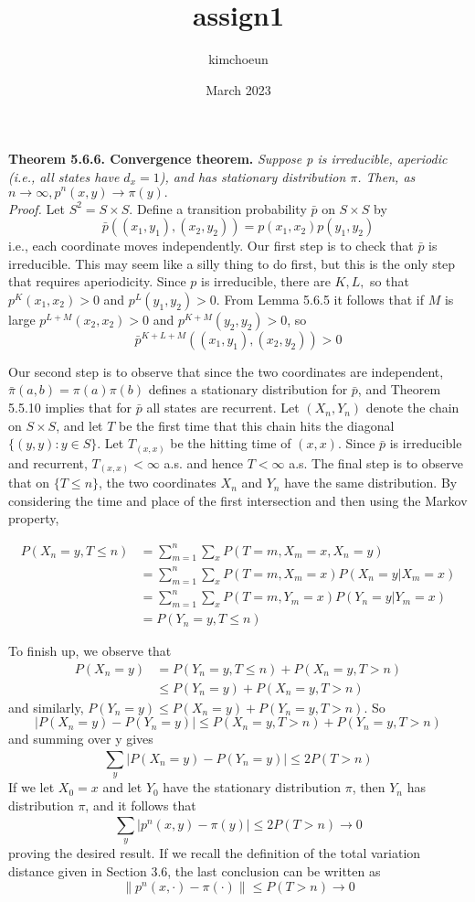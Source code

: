 \documentclass[10pt]{article}
\title{assign1}
\author{kimchoeun}
\date{March 2023}
\begin{document}
\noindent\textbf{Theorem 5.6.6. Convergence theorem.} \textit{Suppose p is irreducible, aperiodic (i.e., all states have $d_{x} = 1$), and has stationary distribution $\pi$. Then, as $n \rightarrow \infty, p^{n}(x,y) \rightarrow \pi(y).$}\\

\noindent\textit{Proof.} Let $S^{2} = S \times S.$ Define a transition probability $\bar{p}$ on $S \times S$ by $$\bar{p}((x_{1}, y_{1}), (x_{2}, y_{2})) = p(x_{1}, x_{2})p(y_{1}, y_{2})$$i.e., each coordinate moves independently. Our first step is to check that $\bar{p}$ is irreducible. This may seem like a silly thing to do first, but this is the only step that requires aperiodicity. Since $p$ is irreducible, there are $K, L,$ so that $p^{K}(x_{1}, x_{2}) > 0$ and $p^{L}(y_{1}, y_{2}) > 0.$ From Lemma 5.6.5 it follows that if $M$ is large $p^{L+M}(x_{2}, x_{2}) > 0$ and $p^{K+M}(y_{2}, y_{2}) > 0$, so $$\bar{p}^{K+L+M}((x_{1}, y_{1}), (x_{2}, y_{2})) > 0$$

Our second step is to observe that since the two coordinates are independent, $\bar{\pi}(a, b) = \pi(a)\pi(b)$ defines a stationary distribution for $\bar{p}$, and Theorem 5.5.10 implies that for $\bar{p}$ all states are recurrent. Let $(X_{n}, Y_{n})$ denote the chain on $S \times S$, and let $T$ be the first time that this chain hits the diagonal $\{(y, y) : y \in S\}$. Let $T_{(x, x)}$ be the hitting time of $(x, x).$ Since $\bar{p}$ is irreducible and recurrent, $T_{(x, x)} < \infty$ a.s. and hence $T < \infty$ a.s. The final step is to observe that on $\{T \le n\}$, the two coordinates $X_{n}$ and $Y_{n}$ have the same distribution. By considering the time and place of the first intersection and then using the Markov property, 

\begin{align}
P(X_{n} = y, T \le n) & = \sum_{m=1}^{n}\sum_{x}^{}P(T = m, X_{m} = x, X_{n} = y)\nonumber\\ 
& = \sum_{m=1}^{n}\sum_{x}^{}P(T = m, X_{m} = x)P(X_{n} = y|X_{m} = x)\nonumber\\
& = \sum_{m=1}^{n}\sum_{x}^{}P(T = m, Y_{m} = x)P(Y_{n} = y|Y_{m} = x)\nonumber\\
& = P(Y_{n} = y, T \le n)\nonumber
\end{align}

\noindent To finish up, we observe that
\begin{align}
P(X_{n} = y) & = P(Y_{n} = y, T \le n) + P(X_{n} = y, T > n)\nonumber\\
& \le P(Y_{n} = y) + P(X_{n} = y, T > n)\nonumber
\end{align}
and similarly, $P(Y_{n} = y) \le P(X_{n} = y) + P(Y_{n} = y, T > n).$ So $$|P(X_{n} = y) - P(Y_{n} = y)| \le P(X_{n} = y, T > n) + P(Y_{n} = y, T > n)$$ and summing over y gives $$\sum_{y}^{}|P(X_{n} = y) - P(Y_{n} = y) | \le 2P(T > n)$$
If we let $X_{0} = x$ and let $Y_{0}$ have the stationary distribution $\pi$, then $Y_{n}$ has distribution $\pi$, and it follows that $$\sum_{y}^{}|p^{n}(x, y) - \pi(y)| \le 2P(T > n) \to 0$$ proving the desired result. If we recall the definition of the total variation distance given in Section 3.6, the last conclusion can be written as $$\|p^{n}(x, \cdot) - \pi(\cdot)\| \le P(T > n) \to 0$$
\end{document}

